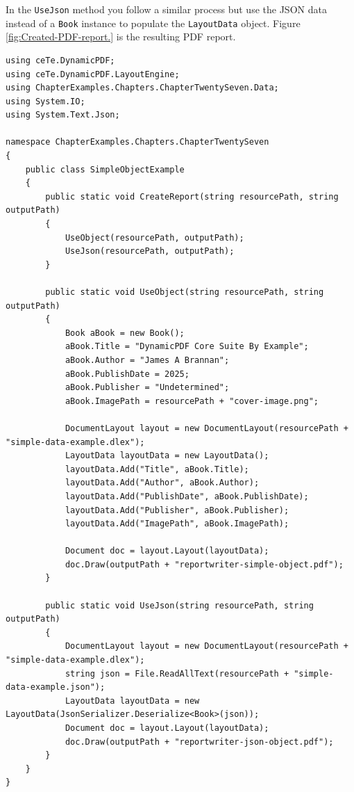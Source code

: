 \documentclass[american]{tufte-book}
\numberwithin{equation}{section}
\numberwithin{figure}{section}
\begin{document}
{{In the \texttt{UseJson} method you follow a similar process but use
the JSON data instead of a \texttt{Book} instance to populate the
\texttt{LayoutData} object. Figure \ref{fig:Created-PDF-report.}
is the resulting PDF report.

\bgroup{}
\begin{lstlisting}[caption={Generating report with simple data.},label={lis:Generating-report-with},basicstyle={\footnotesize\ttfamily},breaklines=true]
using ceTe.DynamicPDF;
using ceTe.DynamicPDF.LayoutEngine;
using ChapterExamples.Chapters.ChapterTwentySeven.Data;
using System.IO;
using System.Text.Json;

namespace ChapterExamples.Chapters.ChapterTwentySeven
{
    public class SimpleObjectExample
    {
        public static void CreateReport(string resourcePath, string outputPath)
        {
            UseObject(resourcePath, outputPath);
            UseJson(resourcePath, outputPath);
        }

        public static void UseObject(string resourcePath, string outputPath)
        {
            Book aBook = new Book();
            aBook.Title = "DynamicPDF Core Suite By Example";
            aBook.Author = "James A Brannan";
            aBook.PublishDate = 2025;
            aBook.Publisher = "Undetermined";
            aBook.ImagePath = resourcePath + "cover-image.png";

            DocumentLayout layout = new DocumentLayout(resourcePath + "simple-data-example.dlex");
            LayoutData layoutData = new LayoutData();
            layoutData.Add("Title", aBook.Title);
            layoutData.Add("Author", aBook.Author);
            layoutData.Add("PublishDate", aBook.PublishDate);
            layoutData.Add("Publisher", aBook.Publisher);
            layoutData.Add("ImagePath", aBook.ImagePath);

            Document doc = layout.Layout(layoutData);
            doc.Draw(outputPath + "reportwriter-simple-object.pdf");
        }

        public static void UseJson(string resourcePath, string outputPath)
        {
            DocumentLayout layout = new DocumentLayout(resourcePath + "simple-data-example.dlex");
            string json = File.ReadAllText(resourcePath + "simple-data-example.json");
            LayoutData layoutData = new LayoutData(JsonSerializer.Deserialize<Book>(json));
            Document doc = layout.Layout(layoutData);
            doc.Draw(outputPath + "reportwriter-json-object.pdf");
        }
    }
}
\end{lstlisting}
\leavevmode\egroup

}}
\end{document}
